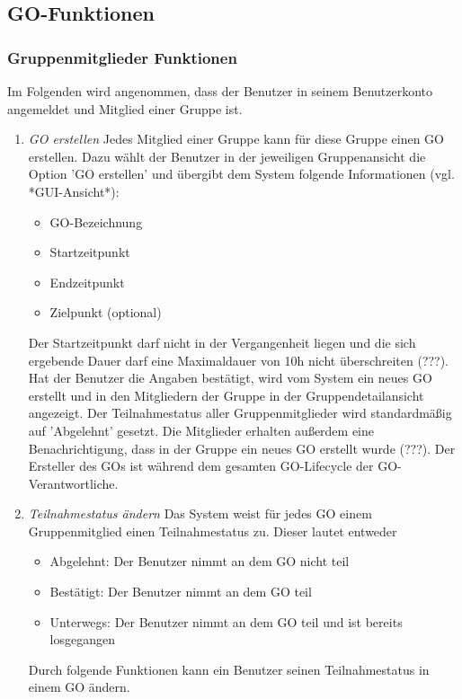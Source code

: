 \documentclass[parskip=full]{scrartcl}
\def\threedigits#1{%
  \ifnum#1<100 0\fi
  \ifnum#1<10 0\fi
  \number#1}
\begin{document}
\subsection{GO-Funktionen}

\subsubsection{Gruppenmitglieder Funktionen}
Im Folgenden wird angenommen, dass der Benutzer in seinem Benutzerkonto angemeldet und Mitglied einer Gruppe ist.

\begin{enumerate}[label={\textbf{/F\protect\threedigits{\theenumi}0/}}, leftmargin=*, resume]	
	\item \textit{GO erstellen} Jedes Mitglied einer Gruppe kann für diese Gruppe einen GO erstellen. Dazu wählt der Benutzer in der jeweiligen Gruppenansicht die Option 'GO erstellen' und übergibt dem System folgende Informationen (vgl. *GUI-Ansicht*):
	\begin{itemize}
		\item GO-Bezeichnung
		\item Startzeitpunkt
		\item Endzeitpunkt
		\item Zielpunkt (optional)
	\end{itemize}
Der Startzeitpunkt darf nicht in der Vergangenheit liegen und die sich ergebende Dauer darf eine Maximaldauer von 10h nicht überschreiten (???).\\
Hat der Benutzer die Angaben bestätigt, wird vom System ein neues GO erstellt und in den Mitgliedern der Gruppe in der Gruppendetailansicht angezeigt. Der Teilnahmestatus aller Gruppenmitglieder wird standardmäßig auf 'Abgelehnt' gesetzt. Die Mitglieder erhalten außerdem eine Benachrichtigung, dass in der Gruppe ein neues GO erstellt wurde (???). Der Ersteller des GOs ist während dem gesamten GO-Lifecycle der GO-Verantwortliche.
	
	
	\item \textit{Teilnahmestatus ändern} Das System weist für jedes GO einem Gruppenmitglied einen Teilnahmestatus zu. Dieser lautet entweder
	\begin{itemize}
		\item Abgelehnt: Der Benutzer nimmt an dem GO nicht teil
		\item Bestätigt: Der Benutzer nimmt an dem GO teil
		\item Unterwegs: Der Benutzer nimmt an dem GO teil und ist bereits losgegangen
	\end{itemize}
Durch folgende Funktionen kann ein Benutzer seinen Teilnahmestatus in einem GO ändern.


\end{enumerate}
\end{document}
